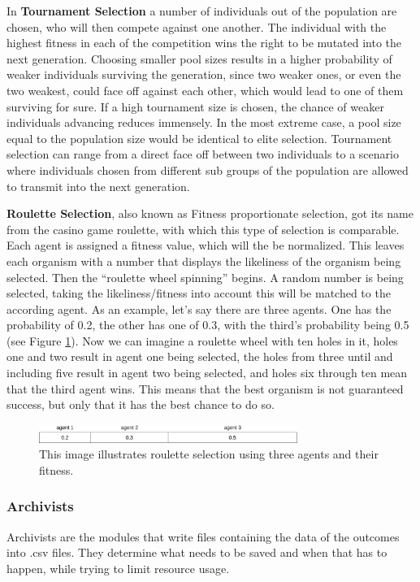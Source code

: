 \documentclass[12pt,oneside,listof=totoc,paper=a4,headings=small]{scrbook}
\begin{document}
In \textbf{Tournament Selection} a number of individuals out of the population are chosen, who will then compete against one another. The individual with the highest fitness in each of the competition wins the right to be mutated into the next generation. Choosing smaller pool sizes results in a higher probability of weaker individuals surviving the generation, since two weaker ones, or even the two weakest, could face off against each other, which would lead to one of them surviving for sure. If a high tournament size is chosen, the chance of weaker individuals advancing reduces immensely. In the most extreme case, a pool size equal to the population size would be identical to elite selection. Tournament selection can range from a direct face off between two individuals to a scenario where individuals chosen from different sub groups of the population are allowed to transmit into the next generation.  

\newpage
\textbf{Roulette Selection}, also known as Fitness proportionate selection, got its name from the casino game roulette, with which this type of selection is comparable. Each agent is assigned a fitness value, which will the be normalized. This leaves each organism with a number that displays the likeliness of the organism being selected. Then the ``roulette wheel spinning'' begins. A random number is being selected, taking the likeliness/fitness into account this will be matched to the according agent. As an example, let's say there are three agents. One has the probability of 0.2, the other has one of 0.3, with the third's probability being 0.5 (see Figure \ref{fig:roulette}). Now we can imagine a roulette wheel with ten holes in it, holes one and two result in agent one being selected, the holes from three until and including five result in agent two being selected, and holes six through ten mean that the third agent wins. This means that the best organism is not guaranteed success, but only that it has the best chance to do so.

\begin{figure}[h!]
\centering
\includegraphics[width=0.75\textwidth,height=0.75\textheight,keepaspectratio]{images/roulette.png}
\caption{This image illustrates roulette selection using three agents and their fitness.}
\label{fig:roulette}
\end{figure}


\subsubsection{Archivists}
Archivists are the modules that write files containing the data of the outcomes into .csv files. They determine what needs to be saved and when that has to happen, while trying to limit resource usage.
\end{document}
